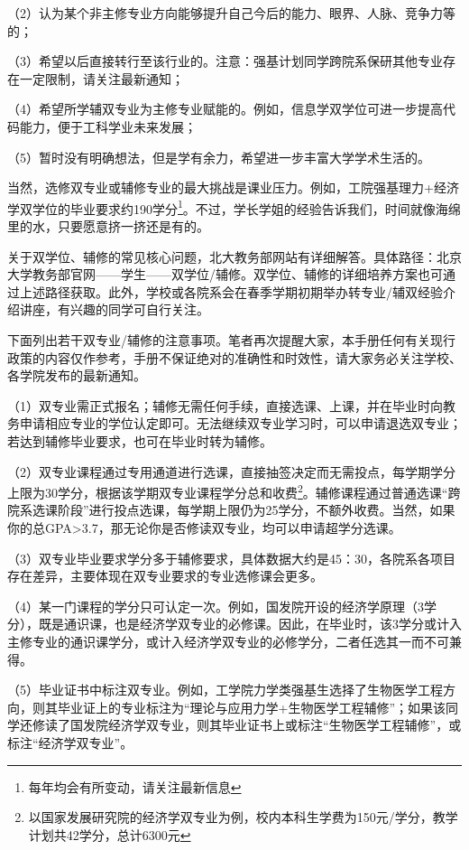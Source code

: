 \documentclass[11pt,oneside]{book}
\begin{document}
（2）认为某个非主修专业方向能够提升自己今后的能力、眼界、人脉、竞争力等的；

（3）希望以后直接转行至该行业的。注意：强基计划同学跨院系保研其他专业存在一定限制，请关注最新通知；

（4）希望所学辅双专业为主修专业赋能的。例如，信息学双学位可进一步提高代码能力，便于工科学业未来发展；

（5）暂时没有明确想法，但是学有余力，希望进一步丰富大学学术生活的。

\vspace{10pt}

当然，选修双专业或辅修专业的最大挑战是课业压力。例如，工院强基理力+经济学双学位的毕业要求约190学分\footnote{每年均会有所变动，请关注最新信息}。不过，学长学姐的经验告诉我们，时间就像海绵里的水，只要愿意挤一挤还是有的。

关于双学位、辅修的常见核心问题，北大教务部网站有详细解答。具体路径：北京大学教务部官网——学生——双学位/辅修。双学位、辅修的详细培养方案也可通过上述路径获取。此外，学校或各院系会在春季学期初期举办转专业/辅双经验介绍讲座，有兴趣的同学可自行关注。

\vspace{10pt}

下面列出若干双专业/辅修的注意事项。笔者再次提醒大家，本手册任何有关现行政策的内容仅作参考，手册不保证绝对的准确性和时效性，请大家务必关注学校、各学院发布的最新通知。

（1）双专业需正式报名；辅修无需任何手续，直接选课、上课，并在毕业时向教务申请相应专业的学位认定即可。无法继续双专业学习时，可以申请退选双专业；若达到辅修毕业要求，也可在毕业时转为辅修。

（2）双专业课程通过专用通道进行选课，直接抽签决定而无需投点，每学期学分上限为30学分，根据该学期双专业课程学分总和收费\footnote{以国家发展研究院的经济学双专业为例，校内本科生学费为150元/学分，教学计划共42学分，总计6300元}。辅修课程通过普通选课“跨院系选课阶段”进行投点选课，每学期上限仍为25学分，不额外收费。当然，如果你的总GPA>3.7，那无论你是否修读双专业，均可以申请超学分选课。

（3）双专业毕业要求学分多于辅修要求，具体数据大约是45：30，各院系各项目存在差异，主要体现在双专业要求的专业选修课会更多。

（4）某一门课程的学分只可认定一次。例如，国发院开设的经济学原理（3学分），既是通识课，也是经济学双专业的必修课。因此，在毕业时，该3学分或计入主修专业的通识课学分，或计入经济学双专业的必修学分，二者任选其一而不可兼得。

（5）毕业证书中标注双专业。例如，工学院力学类强基生选择了生物医学工程方向，则其毕业证上的专业标注为“理论与应用力学+生物医学工程辅修”；如果该同学还修读了国发院经济学双专业，则其毕业证书上或标注“生物医学工程辅修”，或标注“经济学双专业”。
\end{document}
